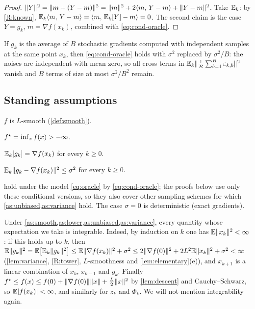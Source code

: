 \begin{proof}
$\lVert Y\rVert^2=\lVert m+(Y-m)\rVert^2=\lVert m\rVert^2+2\langle m,\, Y-m\rangle+\lVert Y-m\rVert^2$. Take $\mathbb{E}_k$: by
\ref{R:known}, $\mathbb{E}_k\langle m,\, Y-m\rangle=\langle m,\, \mathbb{E}_k[Y]-m\rangle=0$. The second claim is the case $Y=g_k$,
$m=\nabla f(x_k)$, combined with \eqref{eq:cond-oracle}.
\end{proof}

\begin{remark}\label{rem:minibatch}
If $g_k$ is the average of $B$ stochastic gradients computed with independent samples at
the same point $x_k$, then \eqref{eq:cond-oracle} holds with $\sigma^2$ replaced by
$\sigma^2/B$: the noises are independent with mean zero, so all cross terms in
$\mathbb{E}_k\lVert \frac1B\sum_{b=1}^B\varepsilon_{k,b}\rVert^2$ vanish and $B$ terms of size at most
$\sigma^2/B^2$ remain.
\end{remark}

\subsection{Standing assumptions}

\begin{assumption}[Smoothness]\label{as:smooth}
$f$ is $L$-smooth (\cref{def:smooth}).
\end{assumption}
\begin{assumption}\label{as:lower}
$f^\star=\inf_x f(x)>-\infty$.
\end{assumption}
\begin{assumption}\label{as:unbiased}
$\mathbb{E}_k[g_k]=\nabla f(x_k)$ for every $k\ge0$.
\end{assumption}
\begin{assumption}\label{as:variance}
$\mathbb{E}_k\lVert g_k-\nabla f(x_k)\rVert^2\le\sigma^2$ for every $k\ge0$.
\end{assumption}

 hold under the model \eqref{eq:oracle} by \eqref{eq:cond-oracle};
the proofs below use only these conditional versions, so they also cover other sampling
schemes for which \cref{as:unbiased,as:variance} hold. The case $\sigma=0$ is
deterministic (exact gradients).

\begin{remark}\label{rem:integrability}
Under \cref{as:smooth,as:lower,as:unbiased,as:variance}, every quantity whose expectation
we take is integrable.
Indeed, by induction on $k$ one has $\mathbb{E}\lVert x_k\rVert^2<\infty$: if this holds up to $k$,
then $\mathbb{E}\lVert g_k\rVert^2=\mathbb{E}\bigl[\mathbb{E}_k\lVert g_k\rVert^2\bigr]\le\mathbb{E}\lVert \nabla f(x_k)\rVert^2+\sigma^2
\le2\lVert \nabla f(0)\rVert^2+2L^2\mathbb{E}\lVert x_k\rVert^2+\sigma^2<\infty$ (\cref{lem:variance},
\ref{R:tower}, $L$-smoothness and \cref{lem:elementary}(e)), and $x_{k+1}$ is a linear
combination of $x_k$, $x_{k-1}$ and $g_k$. Finally
$f^\star\le f(x)\le f(0)+\lVert \nabla f(0)\rVert\lVert x\rVert+\frac L2\lVert x\rVert^2$ by \cref{lem:descent}
and Cauchy--Schwarz, so $\mathbb{E}|f(x_k)|<\infty$, and similarly for $z_k$ and $\Phi_k$. We
will not mention integrability again.
\end{remark}
